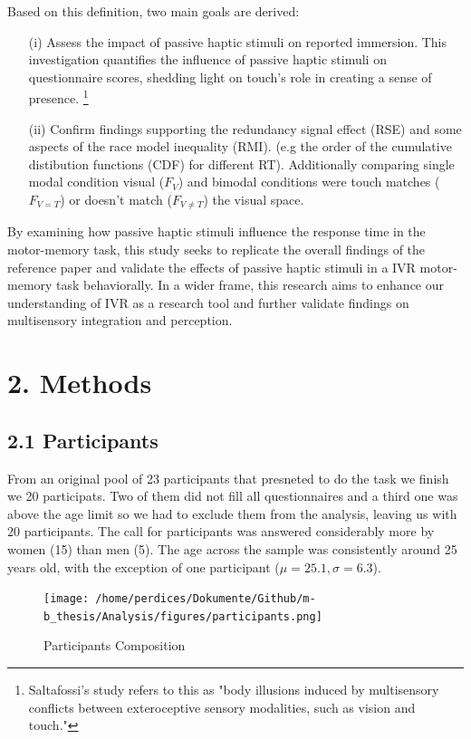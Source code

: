 \documentclass[12pt,oneside,openright]{report}
\begin{document}
Based on this definition, two main goals are derived:
\begin{itemize}
  \item[(i)] Assess the impact of passive haptic stimuli on reported immersion. This investigation quantifies the influence of passive haptic stimuli on questionnaire scores, shedding light on touch's role in creating a sense of presence. 
  \footnote{Saltafossi's study refers to this as "body illusions induced by multisensory conflicts between exteroceptive sensory modalities, such as vision and touch."}
    
  \item[(ii)] Confirm findings supporting the redundancy signal effect (RSE) and some aspects of the race model inequality (RMI). (e.g the order of the cumulative distibution functions (CDF) for different RT). Additionally comparing single modal condition visual ($F_V$) and bimodal conditions were touch matches ($F_{V=T}$) or doesn’t match ($F_{V \neq T}$) the visual space. 
\end{itemize}

By examining how passive haptic stimuli influence the response time in the motor-memory task, this study seeks to replicate the overall findings of the reference paper \parencite{SALTAFOSSI2023108642} and validate the effects of passive haptic stimuli in a IVR motor-memory task behaviorally. In a wider frame, this research aims to enhance our understanding of IVR as a research tool and further validate findings on multisensory integration and perception.

\section*{2. Methods}
    \subsection*{2.1 Participants}
    From an original pool of 23 participants that presneted to do the task we finish we 20 participats. Two of them did not fill all questionnaires and a third one was above the age limit  so we had to exclude them from the analysis, leaving us with 20 participants. The call for participants was answered considerably more by women (15) than men (5). The age across the sample was consistently around 25 years old, with the exception of one participant ($\mu=25.1 , \sigma=6.3$).
    \begin{figure}[h]
        \centering
        \texttt{[image: /home/perdices/Dokumente/Github/m-b\_thesis/Analysis/figures/participants.png]}
        \caption{Participants Composition}
        \label{fig:mesh1}
    \end{figure}
    
\end{document}
